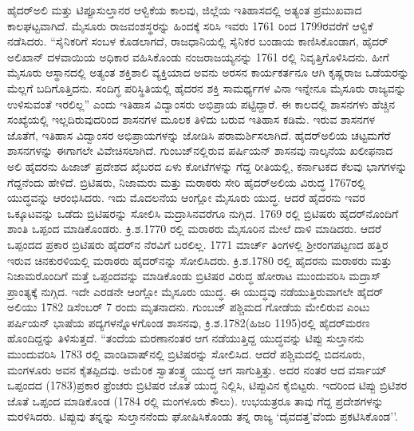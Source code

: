 ಹೈದರ್​ಅಲಿ ಮತ್ತು ಟಿಪ್ಪೂಸುಲ್ತಾನರ ಆಳ್ವಿಕೆಯ ಕಾಲವು, ಜಿಲ್ಲೆಯ ಇತಿಹಾಸದಲ್ಲಿ ಅತ್ಯಂತ ಪ್ರಮುಖವಾದ ಕಾಲಘಟ್ಟ\-ವಾಗಿದೆ. ಮೈಸೂರು ರಾಜವಂಶಸ್ಥರನ್ನು ಹಿಂದಕ್ಕೆ ಸರಿಸಿ ಇವರು 1761 ರಿಂದ 1799ರವರೆಗೆ ಆಳ್ವಿಕೆ ನಡೆಸಿದರು. “ಸೈನಿಕರಿಗೆ ಸಂಬಳ ಕೊಡಲಾಗದೆ, ರಾಜಧಾನಿಯಲ್ಲಿ ಸೈನಿಕರ ಬಂಡಾಯ ಕಾಣಿಸಿಕೊಂಡಾಗ, ಹೈದರ್ ಅಲಿಖಾನ್ ದಳವಾಯಿಯ ಅಧಿಕಾರ ವಹಿಸಿಕೊಂಡು ನಂಜರಾಜಯ್ಯನನ್ನು 1761 ರಲ್ಲಿ ನಿವೃತ್ತಿಗೊಳಿಸಿದನು. ಹೀಗೆ ಮೈಸೂರು ಆಸ್ಥಾನದಲ್ಲಿ ಅತ್ಯಂತ ಶಕ್ತಿಶಾಲಿ ವ್ಯಕ್ತಿ\-ಯಾದ ಅವನು ಅರಸನ ಕಾರ್ಯಕರ್ತನೂ ಆಗಿ ಕೃಷ್ಣರಾಜ ಒಡೆಯರನ್ನು ಮೆಲ್ಲಗೆ ಬದಿಗೊತ್ತಿದನು. ಸಂದಿಗ್ಧ ಪರಿಸ್ಥಿತಿಯಲ್ಲಿ ಹೈದರನ ಶಕ್ತಿ ಸಾಮರ್ಥ್ಯಗಳ ವಿನಾ ಇನ್ನೇನೂ ಮೈಸೂರು ರಾಜ್ಯವನ್ನು ಉಳಿಸುವಂತೆ ಇರಲಿಲ್ಲ'' ಎಂದು ಇತಿಹಾಸ ವಿದ್ವಾಂಸರು ಅಭಿಪ್ರಾಯ ಪಟ್ಟಿದ್ದಾರೆ. ಈ ಕಾಲದಲ್ಲಿ ಶಾಸನಗಳು ಹೆಚ್ಚಿನ ಸಂಖ್ಯೆಯಲ್ಲಿ ಇಲ್ಲದಿರುವುದರಿಂದ ಶಾಸನಗಳ ಮೂಲಕ ತಿಳಿದು ಬರುವ ಇತಿಹಾಸ ಕಡಿಮೆ. ಇರುವ ಶಾಸನಗಳ ಜೊತೆಗೆ, ಇತಿಹಾಸ ವಿದ್ವಾಂಸರ ಅಭಿಪ್ರಾಯಗಳನ್ನು ಜೋಡಿಸಿ ಪರಾಮರ್ಶಿಸಲಾಗಿದೆ. ಹೈದರ್​ಅಲಿಯ ಚಟ್ಟಮಗೆರೆ ಶಾಸನಗಳನ್ನು ಈಗಾಗಲೇ ವಿವೇಚಿಸಲಾಗಿದೆ. ಗುಂಬಜ್​ನಲ್ಲಿರುವ ಪರ್ಷಿಯನ್​ ಶಾಸನವು ನಾಲ್ಕನೆಯ ಖಲೀಫನಾದ ಅಲಿ ಹೈದರನು ಹಿಜಾಜ್​ ಪ್ರದೇಶದ ಖೈಬರದ ಏಳು ಕೋಟೆಗಳನ್ನು ಗೆದ್ದ ರೀತಿಯಲ್ಲಿ, ಕರ್ನಾಟಕದ ಕೆಲವು ಭಾಗಗಳನ್ನು ಗೆದ್ದನೆಂದು ಹೇಳಿದೆ. ಬ್ರಿಟಿಷರು, ನಿಜಾಮರು ಮತ್ತು ಮರಾಠರು ಸೇರಿ ಹೈದರ್​ ಅಲಿಯ ವಿರುದ್ಧ 1767ರಲ್ಲಿ ಯುದ್ಧವನ್ನು ಆರಂಭಿಸಿದರು. ಇದು ಮೊದಲನೆಯ ಆಂಗ್ಲೋ ಮೈಸೂರು ಯುದ್ಧ. ಆದರೆ ಹೈದರನು ಇವರ ಒಕ್ಕೂಟವನ್ನು ಒಡೆದು ಬ್ರಿಟಿಷರನ್ನು ಸೋಲಿಸಿ ಮದ್ರಾಸಿನವರೆಗೂ ನುಗ್ಗಿದ. 1769 ರಲ್ಲಿ ಬ್ರಿಟಿಷರು ಹೈದರ್​ನೊಂದಿಗೆ ಶಾಂತಿ ಒಪ್ಪಂದ ಮಾಡಿಕೊಂಡರು. ಕ್ರಿ.ಶ.1770 ರಲ್ಲಿ ಮರಾಠರು ಮೈಸೂರಿನ ಮೇಲೆ ದಾಳಿ ಮಾಡಿದರು. ಆದರೆ ಒಪ್ಪಂದದ ಪ್ರಕಾರ ಬ್ರಿಟಿಷರು ಹೈದರ್​ನ ನೆರವಿಗೆ ಬರಲಿಲ್ಲ. 1771 ಮಾರ್ಚ್ ತಿಂಗಳಲ್ಲಿ ಶ‍್ರೀರಂಗಪಟ್ಟಣದ ಹತ್ತಿರ ಇರುವ ಚಿನಕುರಳಿಯಲ್ಲಿ ಮರಾಠರು ಹೈದರ್​ನನ್ನು ಸೋಲಿಸಿದರು. ಕ್ರಿ.ಶ.1780 ರಲ್ಲಿ ಹೈದರನು ಮರಾಠರು ಮತ್ತು ನಿಜಾಮರೊಂದಿಗೆ ಮತ್ತೆ ಒಪ್ಪಂದವನ್ನು ಮಾಡಿಕೊಂಡು ಬ್ರಿಟಿಷರ ವಿರುದ್ಧ ಹೋರಾಟ ಮುಂದುವರಿಸಿ ಮದ್ರಾಸ್​ ಪ್ರಾಂತ್ಯಕ್ಕೆ ನುಗ್ಗಿದ. ಇದೇ ಎರಡನೇ ಆಂಗ್ಲೋ ಮೈಸೂರು ಯುದ್ಧ. ಈ ಯುದ್ಧವು ನಡೆಯುತ್ತಿರುವಾಗಲೇ ಹೈದರ್​ಅಲಿಯು 1782 ಡಿಸೆಂಬರ್​ 7 ರಂದು ಮೃತನಾದನು. ಗುಂಬಜ್​ ಪಶ್ಚಿಮದ ಗೋಡೆಯ ಮೇಲಿರುವ ಎಂಟು ಪರ್ಷಿಯನ್​ ಭಾಷೆಯ ಪದ್ಯಗಳನ್ನೊಳಗೊಂಡ ಶಾಸನವು, ಕ್ರಿ.ಶ.1782(ಹಿಜರಿ 1195)ರಲ್ಲಿ ಹೈದರ್​ ಮರಣ ಹೊಂದಿದ್ದನ್ನು ತಿಳಿಸುತ್ತದೆ. “ತಂದೆಯ ಮರಣಾನಂತರ ಆಗ ನಡೆಯುತ್ತಿದ್ದ ಯುದ್ಧವನ್ನು ಟಿಪ್ಪು ಸುಲ್ತಾನನು ಮುಂದುವರಿಸಿ 1783 ರಲ್ಲಿ ವಾಂಡಿವಾಷ್​ನಲ್ಲಿ ಬ್ರಿಟಿಷರನ್ನು ಸೋಲಿಸಿದ. ಆದರೆ ಪಶ್ಚಿಮದಲ್ಲಿ ಬಿದನೂರು, ಮಂಗಳೂರು ಅವನ ಕೈತಪ್ಪಿದವು. ಅಮೆರಿಕ ಸ್ವಾತಂತ್ರ್ಯ ಯುದ್ಧ ಆಗ ಸಾಗುತ್ತಿತ್ತು. ಅದರ ನಂತರ ಆದ ವರ್ಸಾಯ್ ಒಪ್ಪಂದದ (1783)ಪ್ರಕಾರ ಫ್ರೆಂಚರು ಬ್ರಿಟಿಷರ ಜೊತೆ ಯುದ್ಧ ನಿಲ್ಲಿಸಿ, ಟಿಪ್ಪುವಿನ ಕೈಬಿಟ್ಟರು. ಇದರಿಂದ ಟಿಪ್ಪು ಬ್ರಿಟಿಶರ ಜೊತೆ ಒಪ್ಪಂದ ಮಾಡಿಕೊಂಡ (1784 ರಲ್ಲಿ ಮಂಗಳೂರು ಕೌಲು). ಉಭಯತ್ರರೂ ತಾವು ಗೆದ್ದ ಪ್ರದೇಶಗಳನ್ನು ಮರಳಿಸಿದರು. ಟಿಪ್ಪುವು ತನ್ನನ್ನು ಸುಲ್ತಾನನೆಂದು ಘೋಷಿಸಿಕೊಂಡು ತನ್ನ ರಾಜ್ಯ `ದೈವದತ್ತ'ವೆಂದು ಪ್ರಕಟಿಸಿಕೊಂಡ''.

